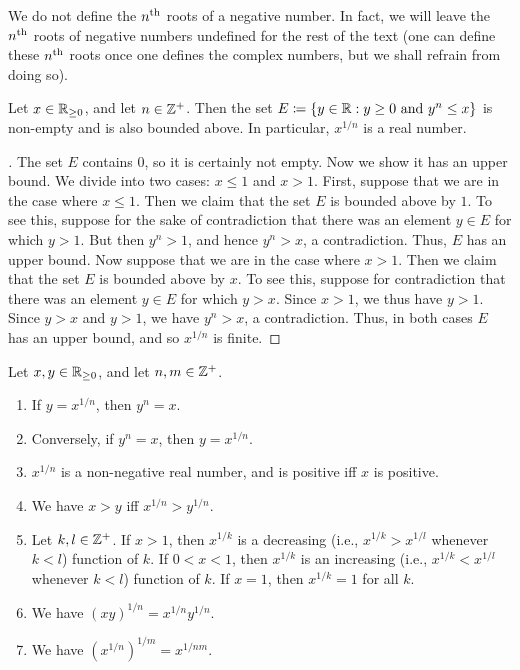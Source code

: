 \begin{note}
  We do not define the \(n^{\operatorname{th}}\) roots of a negative number.
  In fact, we will leave the \(n^{\operatorname{th}}\) roots of negative numbers undefined for the rest of the text
  (one can define these \(n^{\operatorname{th}}\) roots once one defines the complex numbers, but we shall refrain from doing so).
\end{note}

\begin{lem}\label{i:5.6.5}
  Let \(x \in \mathbb{R}_{\geq 0}\), and let \(n \in \mathbb{Z}^+\).
  Then the set \(E \coloneqq \left\lbrace y \in \mathbb{R} : y \geq 0 \text{ and } y^n \leq x\right\rbrace\) is non-empty and is also bounded above.
  In particular, \(x^{1 / n}\) is a real number.
\end{lem}

\begin{proof}[]
  The set \(E\) contains \(0\), so it is certainly not empty.
  Now we show it has an upper bound.
  We divide into two cases: \(x \leq 1\) and \(x > 1\).
  First, suppose that we are in the case where \(x \leq 1\).
  Then we claim that the set \(E\) is bounded above by \(1\).
  To see this, suppose for the sake of contradiction that there was an element \(y \in E\) for which \(y > 1\).
  But then \(y^n > 1\), and hence \(y^n > x\), a contradiction.
  Thus, \(E\) has an upper bound.
  Now suppose that we are in the case where \(x > 1\).
  Then we claim that the set \(E\) is bounded above by \(x\).
  To see this, suppose for contradiction that there was an element \(y \in E\) for which \(y > x\).
  Since \(x > 1\), we thus have \(y > 1\).
  Since \(y > x\) and \(y > 1\), we have \(y^n > x\), a contradiction.
  Thus, in both cases \(E\) has an upper bound, and so \(x^{1 / n}\) is finite.
\end{proof}

\begin{lem}\label{i:5.6.6}
  Let \(x, y \in \mathbb{R}_{\geq 0}\), and let \(n, m \in \mathbb{Z}^+\).
  \begin{enumerate}
    \item\label{i:5.6.6.a} If \(y = x^{1 / n}\), then \(y^n = x\).
    \item\label{i:5.6.6.b} Conversely, if \(y^n = x\), then \(y = x^{1 / n}\).
    \item\label{i:5.6.6.c} \(x^{1 / n}\) is a non-negative real number, and is positive iff \(x\) is positive.
    \item\label{i:5.6.6.d} We have \(x > y\) iff \(x^{1 / n} > y^{1 / n}\).
    \item\label{i:5.6.6.e} Let \(k, l \in \mathbb{Z}^+\).
    If \(x > 1\), then \(x^{1 / k}\) is a decreasing (i.e., \(x^{1 / k} > x^{1 / l}\) whenever \(k < l\)) function of \(k\).
    If \(0 < x < 1\), then \(x^{1 / k}\) is an increasing (i.e., \(x^{1 / k} < x^{1 / l}\) whenever \(k < l\)) function of \(k\).
    If \(x = 1\), then \(x^{1 / k} = 1\) for all \(k\).
    \item\label{i:5.6.6.f} We have \((xy)^{1 / n} = x^{1 / n} y^{1 / n}\).
    \item\label{i:5.6.6.g} We have \((x^{1 / n})^{1 / m} = x^{1 / nm}\).
  \end{enumerate}
\end{lem}

